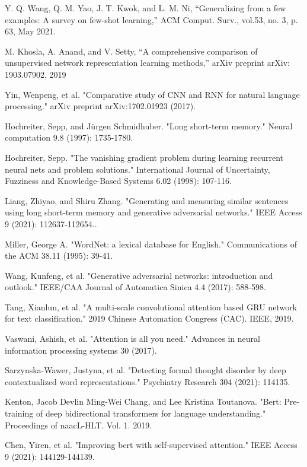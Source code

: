 \documentclass[conference]{IEEEtran}
\begin{document}
\begin{thebibliography}{00}
 Y. Q. Wang, Q. M. Yao, J. T. Kwok, and L. M. Ni, “Generalizing from a few examples: A survey on few-shot learning,” ACM Comput. Surv., vol.53, no. 3, p. 63, May 2021.

 M. Khosla, A. Anand, and V. Setty, “A comprehensive comparison of unsupervised network representation learning methods,” arXiv preprint arXiv: 1903.07902, 2019

 Yin, Wenpeng, et al. "Comparative study of CNN and RNN for natural language processing." arXiv preprint arXiv:1702.01923 (2017).

 Hochreiter, Sepp, and Jürgen Schmidhuber. "Long short-term memory." Neural computation 9.8 (1997): 1735-1780.

 Hochreiter, Sepp. "The vanishing gradient problem during learning recurrent neural nets and problem solutions." International Journal of Uncertainty, Fuzziness and Knowledge-Based Systems 6.02 (1998): 107-116.

 Liang, Zhiyao, and Shiru Zhang. "Generating and measuring similar sentences using long short-term memory and generative adversarial networks." IEEE Access 9 (2021): 112637-112654..

 Miller, George A. "WordNet: a lexical database for English." Communications of the ACM 38.11 (1995): 39-41.

 Wang, Kunfeng, et al. "Generative adversarial networks: introduction and outlook." IEEE/CAA Journal of Automatica Sinica 4.4 (2017): 588-598.

 Tang, Xianlun, et al. "A multi-scale convolutional attention based GRU network for text classification." 2019 Chinese Automation Congress (CAC). IEEE, 2019.

 Vaswani, Ashish, et al. "Attention is all you need." Advances in neural information processing systems 30 (2017).

 Sarzynska-Wawer, Justyna, et al. "Detecting formal thought disorder by deep contextualized word representations." Psychiatry Research 304 (2021): 114135.

 Kenton, Jacob Devlin Ming-Wei Chang, and Lee Kristina Toutanova. "Bert: Pre-training of deep bidirectional transformers for language understanding." Proceedings of naacL-HLT. Vol. 1. 2019.

 Chen, Yiren, et al. "Improving bert with self-supervised attention." IEEE Access 9 (2021): 144129-144139.


\end{thebibliography}
\end{document}
